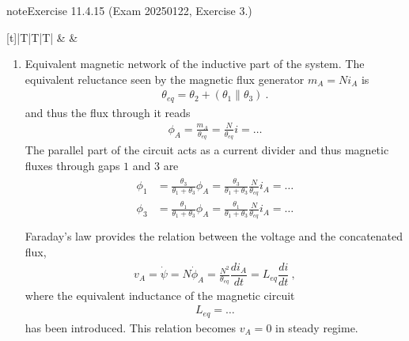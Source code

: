 \documentclass[letterpaper,10pt,english]{jupyterBook}
\begin{document}
\begin{sphinxadmonition}{note}{Exercise 11.4.15 (Exam 2025\sphinxhyphen{}01\sphinxhyphen{}22, Exercise 3.)}
\begin{savenotes}
\begin{tabulary}{\linewidth}[t]{|T|T|T|}
\sphinxAtStartPar
{}
&
\sphinxAtStartPar
{}
&
\sphinxAtStartPar
{}
\\
\hline
\end{tabulary}
\par
\sphinxattableend\end{savenotes}
\begin{enumerate}
%
\item {} 
\sphinxAtStartPar
Equivalent magnetic network of the inductive part of the system. The equivalent reluctance seen by the magnetic flux generator \(m_A = N i_A\) is
\begin{equation*}
\begin{split}\theta_{eq} = \theta_2 + \left( \theta_1 \parallel \theta_3 \right) \ .\end{split}
\end{equation*}
\sphinxAtStartPar
and thus the flux through it reads
\begin{equation*}
\begin{split}\phi_A = \frac{m_A}{\theta_{eq}} = \frac{N}{\theta_{eq}} i = \dots\end{split}
\end{equation*}
\sphinxAtStartPar
The parallel part of the circuit acts as a current divider and thus magnetic fluxes through gaps \(1\) and \(3\) are
\begin{equation}\label{equation:ch/electrical-engineering-exercises-electromagnetic:eq:2025-01-22:fluxes}
\begin{split}\begin{aligned}
      \phi_1 & = \frac{\theta_3}{\theta_1 + \theta_3} \phi_A = \frac{\theta_3}{\theta_1 + \theta_3} \frac{N}{\theta_{eq}} i_A = \dots \\
      \phi_3 & = \frac{\theta_1}{\theta_1 + \theta_3} \phi_A = \frac{\theta_1}{\theta_1 + \theta_3} \frac{N}{\theta_{eq}} i_A = \dots \\
    \end{aligned}\end{split}
\end{equation}
\sphinxAtStartPar
Faraday’s law provides the relation between the voltage and the concatenated flux,
\begin{equation*}
\begin{split}v_A = \dot{\psi} = N \dot{\phi}_A = \frac{N^2}{\theta_{eq}} \dfrac{d i_A}{dt} = L_{eq} \dfrac{di}{dt} \ ,\end{split}
\end{equation*}
\sphinxAtStartPar
where the equivalent inductance of the magnetic circuit
\begin{equation*}
\begin{split}L_{eq} = \dots\end{split}
\end{equation*}
\sphinxAtStartPar
has been introduced. This relation becomes \(v_A = 0\) in steady regime.


\end{enumerate}
\end{sphinxadmonition}
\end{document}
